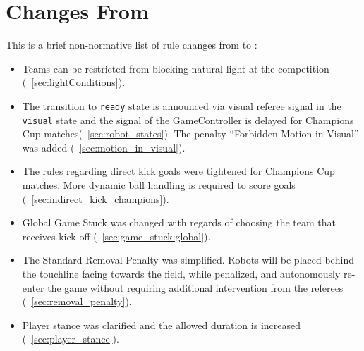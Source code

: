 \section{Changes From \LastRCYear}

This is a brief non-normative list of rule changes from \LastRCYear to \RCYear:
\begin{itemize}
  \item Teams can be restricted from blocking natural light at the competition (\cf~\cref{sec:lightConditions}).
  \item The transition to \texttt{ready} state is announced via visual referee signal in the \texttt{visual} state and the signal of the GameController is delayed for Champions Cup matches(\cf~\cref{sec:robot_states}). The penalty ``Forbidden Motion in Visual'' was added (\cf~\cref{sec:motion_in_visual}).
  \item The rules regarding direct kick goals were tightened for Champions Cup matches. More dynamic ball handling is required to score goals (\cf~\cref{sec:indirect_kick_champions}).
  \item Global Game Stuck was changed with regards of choosing the team that receives kick-off (\cf~\cref{sec:game_stuck:global}).
  \item The Standard Removal Penalty was simplified. Robots will be placed behind the touchline facing towards the field, while penalized, and autonomously re-enter the game without requiring additional intervention from the referees (\cf~\cref{sec:removal_penalty}).
  \item Player stance was clarified and the allowed duration is increased (\cf~\cref{sec:player_stance}).
\end{itemize}

